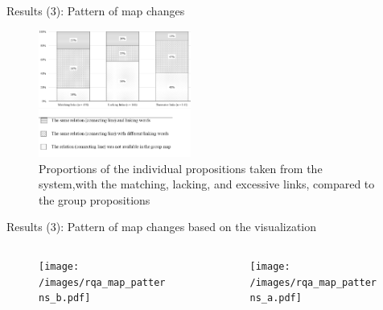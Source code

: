 \begin{frame}{Results (3): Pattern of map changes}

\begin{figure}[tb]
    \begin{center}
        \includegraphics[width=50mm]{images/dist_match_links.pdf}
    \end{center}
    \caption{Proportions of the individual propositions taken from the system,with  the  matching,  lacking,  and  excessive  links,  compared  to  the  group propositions}
    \label{a1::map_sample_1}
\end{figure}

\end{frame}
\begin{frame}{Results (3): Pattern of map changes based on the visualization}

    \begin{columns}
        \begin{column}{0.5\textwidth}
            \begin{center}
                \begin{figure}[tb]
                    \texttt{[image: /images/rqa\_map\_patterns\_b.pdf]}
                \end{figure}
            \end{center}
        \end{column}
        \begin{column}{0.5\textwidth}  %
            \begin{center}
                \begin{figure}[tb]
                    \texttt{[image: /images/rqa\_map\_patterns\_a.pdf]}
                \end{figure}
            \end{center}
        \end{column}
    \end{columns} 
    
    
    
\end{frame}


